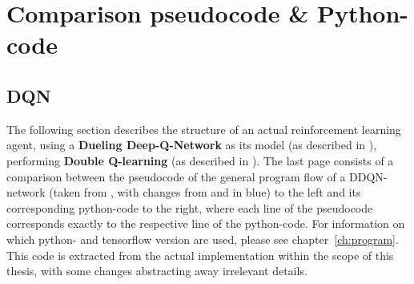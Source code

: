 


\chapter{Comparison pseudocode \& Python-code} %

\label{AppendixA} %

\vspace{-0.8cm}

\section{DQN}
\label{ap:dqn}

The following section describes the structure of an actual reinforcement learning agent, using a \textbf{Dueling Deep-Q-Network} as its model (as described in \cite{wang_dueling_2015}), performing \textbf{Double Q-learning} (as described in \cite{van_hasselt_deep_2015}). The last page consists of a comparison between the pseudocode of the general program flow of a DDQN-network (taken from \cite{mnih_human-level_2015}, with changes from \cite{van_hasselt_deep_2015} and \cite{lillicrap_continuous_2015} in blue) to the left and its corresponding python-code to the right, where each line of the pseudocode corresponds exactly to the respective line of the python-code. For information on which python- and tensorflow version are used, please see chapter~\ref{ch:program}. This code is extracted from the actual implementation within the scope of this thesis, with some changes abstracting away irrelevant details.\\


\begin{landscape}
	\begin{parcolumns}[distance=0.1em,colwidths={1=33em}]{2}
		\label{ap:dqn_comparison}
		\colchunk[1]{ }
		\colchunk[2]{  }
	\end{parcolumns}
\end{landscape}

